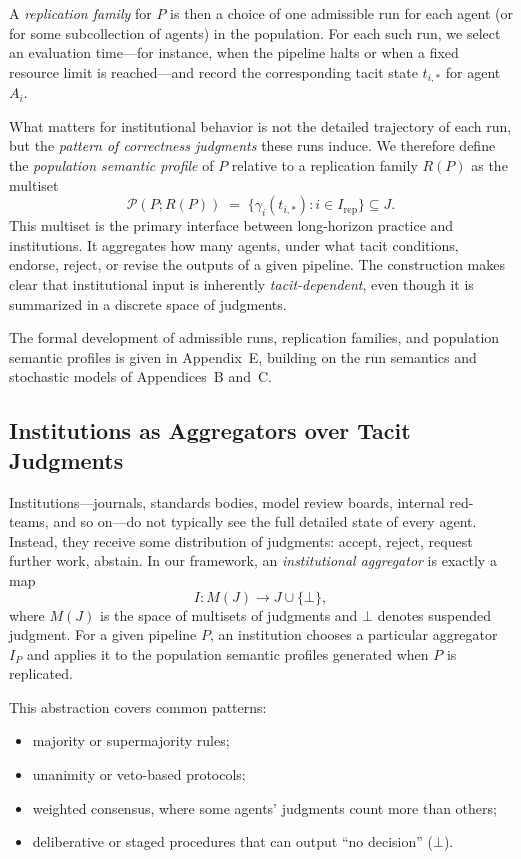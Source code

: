 \documentclass[11pt]{article}
\theoremstyle{definition}
\begin{document}
A \emph{replication family} for $P$ is then a choice of one admissible run for each agent (or for some subcollection of agents) in the population. For each such run, we select an evaluation time---for instance, when the pipeline halts or when a fixed resource limit is reached---and record the corresponding tacit state $t_{i,*}$ for agent $A_i$.

What matters for institutional behavior is not the detailed trajectory of each run, but the \emph{pattern of correctness judgments} these runs induce. We therefore define the \emph{population semantic profile} of $P$ relative to a replication family $R(P)$ as the multiset
\[
  \mathcal{P}(P; R(P)) \;=\; \{ \gamma_i(t_{i,*}) : i \in I_{\mathrm{rep}} \} \subseteq J.
\]
This multiset is the primary interface between long-horizon practice and institutions. It aggregates how many agents, under what tacit conditions, endorse, reject, or revise the outputs of a given pipeline. The construction makes clear that institutional input is inherently \emph{tacit-dependent}, even though it is summarized in a discrete space of judgments.

The formal development of admissible runs, replication families, and population semantic profiles is given in Appendix~E, building on the run semantics and stochastic models of Appendices~B and~C.

\subsection{Institutions as Aggregators over Tacit Judgments}

Institutions---journals, standards bodies, model review boards, internal red-teams, and so on---do not typically see the full detailed state of every agent. Instead, they receive some distribution of judgments: accept, reject, request further work, abstain. In our framework, an \emph{institutional aggregator} is exactly a map
\[
  I : M(J) \to J \cup \{\bot\},
\]
where $M(J)$ is the space of multisets of judgments and $\bot$ denotes suspended judgment. For a given pipeline $P$, an institution chooses a particular aggregator $I_P$ and applies it to the population semantic profiles generated when $P$ is replicated.

This abstraction covers common patterns:
\begin{itemize}
  \item majority or supermajority rules;
  \item unanimity or veto-based protocols;
  \item weighted consensus, where some agents' judgments count more than others;
  \item deliberative or staged procedures that can output ``no decision'' ($\bot$).
\end{itemize}
\end{document}
